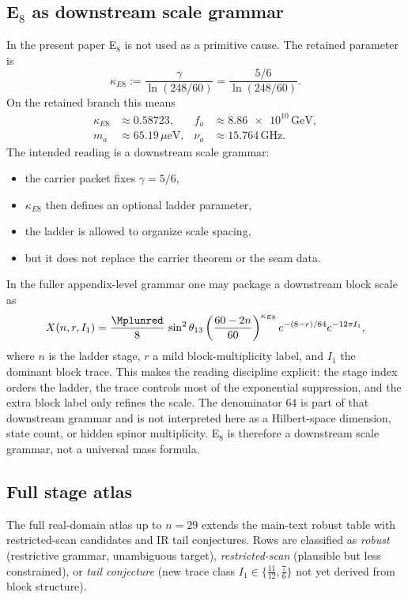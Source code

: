 \subsection{\texorpdfstring{E$_8$}{E8} as downstream scale grammar}

In the present paper E$_8$ is not used as a primitive cause. The retained parameter is
\[
\kappa_{E8}:=\frac{\gamma}{\ln(248/60)}=\frac{5/6}{\ln(248/60)}.
\]
On the retained branch this means
\[
\begin{aligned}
\kappa_{E8}&\approx \num{0.58723},
&
f_a&\approx \num{8.86e10}\,\mathrm{GeV},
\\
m_a&\approx \num{65.19}\,\mu\mathrm{eV},
&
\nu_a&\approx \num{15.764}\,\mathrm{GHz}.
\end{aligned}
\]
The intended reading is a downstream scale grammar:
\begin{itemize}[leftmargin=1.5em, topsep=3pt, itemsep=2pt]
    \item the carrier packet fixes $\gamma=5/6$,
    \item $\kappa_{E8}$ then defines an optional ladder parameter,
    \item the ladder is allowed to organize scale spacing,
    \item but it does not replace the carrier theorem or the seam data.
\end{itemize}
In the fuller appendix-level grammar one may package a downstream block scale as
\[
X(n,r,I_1)=\frac{\Mplunred}{8}\,\sin^2\theta_{13}
\left(\frac{60-2n}{60}\right)^{\kappa_{E8}}
e^{-(8-r)/64}e^{-12\pi I_1},
\]
where $n$ is the ladder stage, $r$ a mild block-multiplicity label, and $I_1$ the dominant block trace. This makes the reading discipline explicit: the stage index orders the ladder, the trace controls most of the exponential suppression, and the extra block label only refines the scale. The denominator $64$ is part of that downstream grammar and is not interpreted here as a Hilbert-space dimension, state count, or hidden spinor multiplicity. E$_8$ is therefore a downstream scale grammar, not a universal mass formula.

\subsection{Full stage atlas}

The full real-domain atlas up to $n=29$ extends the main-text robust table with restricted-scan candidates and IR tail conjectures. Rows are classified as \emph{robust} (restrictive grammar, unambiguous target), \emph{restricted-scan} (plausible but less constrained), or \emph{tail conjecture} (new trace class $I_1\in\{\frac{11}{12},\frac{7}{6}\}$ not yet derived from block structure).

